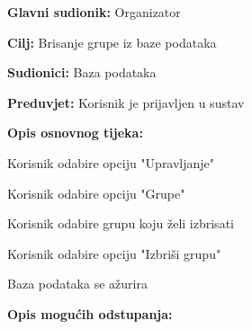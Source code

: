 					\noindent {}
					\begin{packed_item}
						
						\item \textbf{Glavni sudionik: }Organizator
						\item  \textbf{Cilj:} Brisanje grupe iz baze podataka
						\item  \textbf{Sudionici:} Baza podataka
						\item  \textbf{Preduvjet:} Korisnik je prijavljen u sustav
						\item  \textbf{Opis osnovnog tijeka:}
						
						\item[] \begin{packed_enum}
							
							\item Korisnik odabire opciju "Upravljanje"
							\item Korisnik odabire opciju "Grupe"
							\item Korisnik odabire grupu koju želi izbrisati
							\item Korisnik odabire opciju "Izbriši grupu"
							\item Baza podataka se ažurira
						\end{packed_enum}
						
						\item  \textbf{Opis mogućih odstupanja:}
						
					\end{packed_item}
				
